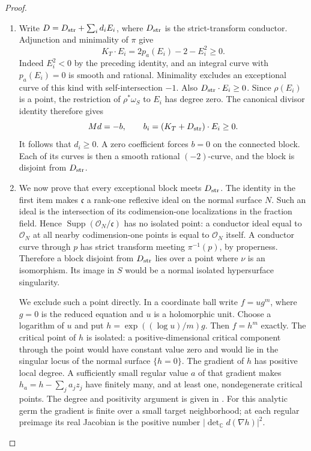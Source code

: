 \begin{proof}
\begin{enumerate}[label=\arabic*.,leftmargin=*]
For $Md=-b$, $b_i\ge0$, set $u_i=d_i/n_i$. The same divisor
equation gives the row identity
\[
 b_i=h_i u_i+\sum_{j\ne i}M_{ij}n_j(u_i-u_j).
\]
A negative minimum of the $u_i$ forces every neighboring value
to equal it and forces $h_i=0$. Propagation through the connected
graph reaches a vertex with $h_i>0$, a contradiction. Thus
$d_i\ge0$. When $b\ne0$, a zero $d_i$ forces all neighboring
$d_j$ to be zero, and propagation contradicts $Md=-b$.
Consequently $d_i>0$ in that case; equivalently, $-M^{-1}$ has
strictly positive entries on the connected block.

\item Write $D=D_{\rm str}+\sum_i d_iE_i$, where
$D_{\rm str}$ is the strict-transform conductor. Adjunction and
minimality of $\pi$ give
\[
 K_T\cdot E_i=2p_a(E_i)-2-E_i^2\ge0.
\]
Indeed $E_i^2<0$ by the preceding identity, and an integral curve
with $p_a(E_i)=0$ is smooth and rational. Minimality excludes an
exceptional curve of this kind with self-intersection $-1$.
Also $D_{\rm str}\cdot E_i\ge0$. Since $\rho(E_i)$ is a point,
the restriction of $\rho^*\omega_S$ to $E_i$ has degree zero.
The canonical divisor identity therefore gives
\[
 Md=-b,\qquad b_i=(K_T+D_{\rm str})\cdot E_i\ge0.
\]
It follows that $d_i\ge0$. A zero coefficient forces $b=0$
on the connected block. Each of its curves is then a smooth
rational $(-2)$-curve, and the block is disjoint from
$D_{\rm str}$.

\item We now prove that every exceptional block meets
$D_{\rm str}$. The identity in the first item makes
$\mathfrak c$ a rank-one reflexive ideal on the normal surface
$N$. Such an ideal is the intersection of its codimension-one
localizations in the fraction field. Hence
$\operatorname{Supp}(\mathcal O_N/\mathfrak c)$ has no isolated
point: a conductor ideal equal to $\mathcal O_N$ at all nearby
codimension-one points is equal to $\mathcal O_N$ itself.
A conductor curve through $p$ has strict transform meeting
$\pi^{-1}(p)$, by properness. Therefore a block disjoint from
$D_{\rm str}$ lies over a point where $\nu$ is an isomorphism.
Its image in $S$ would be a normal isolated hypersurface
singularity.

We exclude such a point directly. In a coordinate ball write
$f=u g^m$, where $g=0$ is the reduced equation and $u$ is a
holomorphic unit. Choose a logarithm of $u$ and put
$h=\exp((\log u)/m)g$. Then $f=h^m$ exactly. The critical point
of $h$ is isolated: a positive-dimensional critical component
through the point would have constant value zero and would lie
in the singular locus of the normal surface $\{h=0\}$.
The gradient of $h$ has positive local degree. A sufficiently
small regular value $a$ of that gradient makes
$h_a=h-\sum_j a_jz_j$ have finitely many, and at least one,
nondegenerate critical points. The degree and positivity
argument is given in \cite[Appendix~B, pp.~111--114]{Milnor1968}.
For this analytic germ the gradient is finite over a small
target neighborhood; at each regular preimage its real
Jacobian is the positive number $|\det_{\mathbb C}d(\nabla h)|^2$.


\end{enumerate}
\end{proof}
